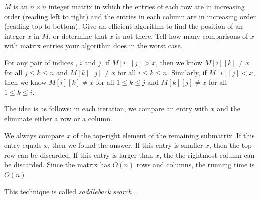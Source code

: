 \begin{Exercise}[origin={NTU CSIE 93}]
$M$ is an $n \times n$ integer matrix in which the entries of each row are in increasing order (reading left to right) and the entries in each column are in increasing order (reading top to bottom). Give an efficient algorithm to find the position of an integer $x$ in $M$, or determine that $x$ is not there. Tell how many comparisons of $x$ with matrix entries your algorithm does in the worst case.
\end{Exercise}
\begin{Answer}
For any pair of indices , $i$ and $j$, if $M[i][j] > x$, then we know $M[i][k] \neq x$ for all $j \leq k \leq n$ and $M[k][j] \neq x$ for all $i \leq k \leq n$. Similarly, if $M[i][j] < x$, then we know $M[i][k] \neq x$ for all $1 \leq k \leq j$ and $M[k][j] \neq x$ for all $1 \leq k \leq i$. 

The idea is as follows: in each iteration, we compare an entry with $x$ and the eliminate either a row or a column.

We always compare $x$ of the top-right element of the remaining submatrix. If this entry equals $x$, then we found the answer. If this entry is smaller $x$, then the top row can be discarded. If this entry is larger than $x$, the the rightmost column can be discarded. Since the matrix has $O(n)$ rows and columns, the running time is $O(n)$. 

\begin{remark}
This technique is called \emph{saddleback search}~\cite{Bird2006}.
\end{remark}
\end{Answer}

